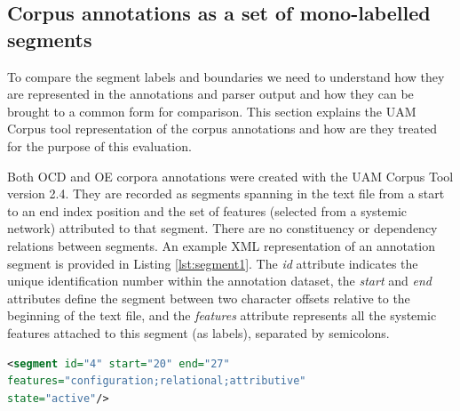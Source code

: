 \subsection{Corpus annotations as a set of mono-labelled segments}

    To compare the segment labels and boundaries we need to understand how they are represented in the annotations and parser output and how they can be brought to a common form for comparison. This section explains the UAM Corpus tool representation of the corpus annotations and how are they treated for the purpose of this evaluation.
    
    Both OCD and OE corpora annotations were created with the UAM Corpus Tool \citep{ODonnell2008,ODonnell2008a} version 2.4. They are recorded as segments spanning in the text file from a start to an end index position and the set of features (selected from a systemic network) attributed to that segment. There are no constituency or dependency relations between segments. An example XML representation of an annotation segment is provided in Listing \ref{lst:segment1}. The \textit{id} attribute indicates the unique identification number within the annotation dataset, the \textit{start} and \textit{end} attributes define the segment between two character offsets relative to the beginning of the text file, and the \textit{features} attribute represents all the systemic features attached to this segment (as labels), separated by semicolons. 

\begin{minipage}{\linewidth}
\begin{lstlisting}[language=XML,basicstyle=\small\tt,frame=single,caption=Segment example in UAM corpus tool,label=lst:segment1]
<segment id="4" start="20" end="27" 
features="configuration;relational;attributive" 
state="active"/>
\end{lstlisting}
\end{minipage}

